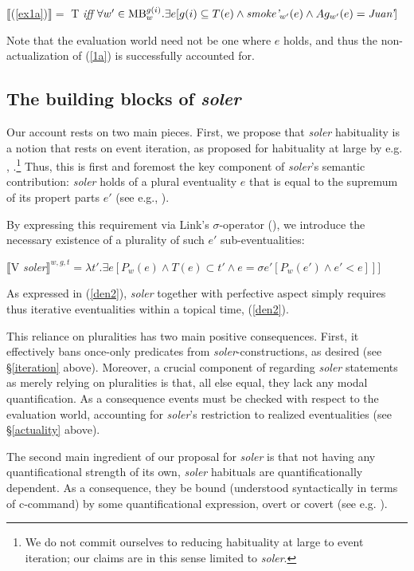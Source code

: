 \documentclass{cascadilla-xelatex-biblatex}
\begin{document}
	\ex\label{den1}$\llbracket$(\ref{ex1a})$\rrbracket =$ T \textit{iff} $\forall w' \in \textnormal{MB}_{w}^{g(i)} . \exists e [g(i) \subseteq T(e) \wedge \textit{smoke'}_{w'}(e) \wedge Ag_{w'}(e) = \textit{Juan'}]$
	\xe 
	
	Note that the evaluation world need not be one where $e$ holds, and thus the non-actualization of (\ref{1a}) is successfully accounted for. 
	
	
	\subsection{The building blocks of \textit{soler}}
	
	Our account rests on two main pieces. First, we propose that \textit{soler} habituality is a notion that rests on event iteration, as proposed for habituality at large by e.g. \textcite{Vlach:1993}, \textcite{Boneh&Doron:2008, Doron&Boneh:2013}.\footnote{We do not commit ourselves to reducing habituality at large to event iteration; our claims are in this sense limited to \textit{soler}.} Thus, this is first and foremost the key component of \textit{soler}'s semantic contribution: \textit{soler} holds of a plural eventuality $e$ that is equal to the supremum of its propert parts $e'$ (see e.g., \cite{Kratzer:2008}). 
	
	By expressing this requirement via Link's $\sigma$-operator (\cite{Link:1983}), we introduce the necessary existence of a plurality of such $e'$ sub-eventualities: 
	
	\ex\label{den2}$\llbracket$V \textit{soler}$\rrbracket^{w,g,t} = \lambda t' . \exists e [P_w(e) \wedge T(e) \subset t' \wedge e = \sigma e'[P_w(e') \wedge e' < e]]]$\xe
	
	As expressed in (\ref{den2}), \textit{soler} together with perfective aspect simply requires thus iterative eventualities within a topical time, (\ref{den2}). 
	
	This reliance on pluralities has two main positive consequences. First, it effectively bans once-only predicates from \textit{soler}-constructions, as desired (see \S\ref{iteration} above). Moreover, a crucial component of regarding \textit{soler} statements as merely relying on pluralities is that, all else equal, they lack any modal quantification. As a consequence events must be checked with respect to the evaluation world, accounting for \textit{soler}'s restriction to realized eventualities (see \S\ref{actuality} above). 
	
	The second main ingredient of our proposal for \textit{soler} is that not having any quantificational strength of its own, \textit{soler} habituals are quantificationally dependent. As a consequence, they be bound (understood syntactically in terms of c-command) by some quantificational expression, overt or covert (see e.g. \cite{Chierchia:1995}). 
	
\end{document}

